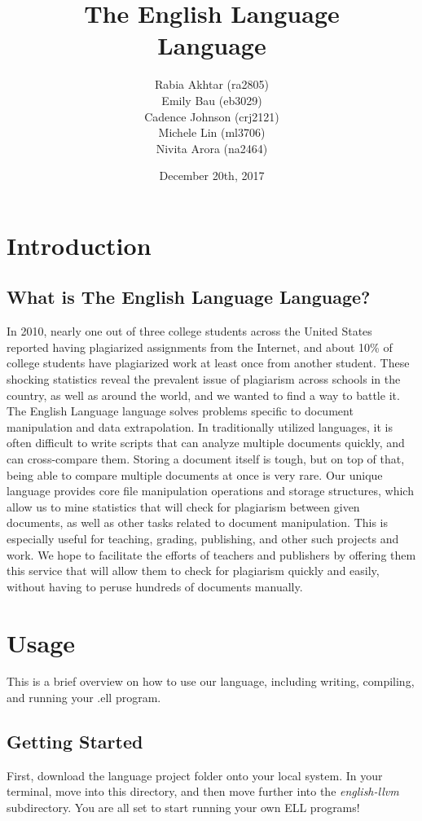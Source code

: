 \documentclass{article}
\title{The English Language \\ Language \\}
\author{Rabia Akhtar (ra2805) \\ Emily Bau (eb3029) \\ Cadence Johnson (crj2121) \\ Michele Lin (ml3706) \\ Nivita Arora (na2464) \\}
\date{December 20th, 2017}
\begin{document}
\maketitle
\newpage
\tableofcontents
\newpage

\section{Introduction}
\subsection{What is The English Language Language?}

In 2010, nearly one out of three college students across the United States reported having plagiarized assignments from the Internet, and about 10\% of college students have plagiarized work at least once from another student. These shocking statistics reveal the prevalent issue of plagiarism across schools in the country, as well as around the world, and we wanted to find a way to battle it. 
\newline \newline
The English Language language solves problems specific to document manipulation and data extrapolation. In traditionally utilized languages, it is often difficult to write scripts that can analyze multiple documents quickly, and can cross-compare them. Storing a document itself is tough, but on top of that, being able to compare multiple documents at once is very rare. Our unique language provides core file manipulation operations and storage structures, which allow us to mine statistics that will check for plagiarism between given documents, as well as other tasks related to document manipulation. This is especially useful for teaching, grading, publishing, and other such projects and work. We hope to facilitate the efforts of teachers and publishers by offering them this service that will allow them to check for plagiarism quickly and easily, without having to peruse hundreds of documents manually.

\newpage

\section{Usage}
This is a brief overview on how to use our language, including writing, compiling, and running your .ell program. \newline

\subsection{Getting Started}
First, download the language project folder onto your local system. In your terminal, move into this directory, and then move further into the \textit{english-llvm} subdirectory. You are all set to start running your own ELL programs!
\end{document}
